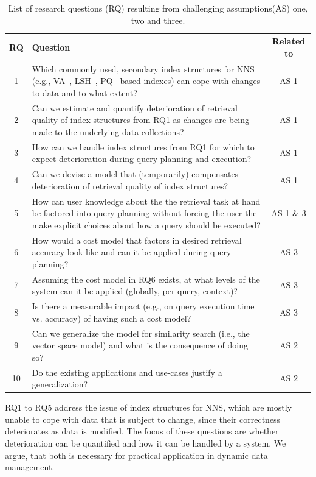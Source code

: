 \begin{table}[h!]
    \centering
    \caption{List of research questions (RQ) resulting from challenging assumptions(AS) one, two and three.}
    \begin{tabular}{|c|p{10cm}|c|} 
     \hline
     \textbf{RQ} & \textbf{Question} & \textbf{Related to} \\ [0.5ex] 
     \hline\hline
     1 & Which commonly used, secondary index structures for NNS (e.g., VA~\cite{Weber:1998va}, LSH~\cite{Indyk:1998lsh}, PQ~\cite{jegou:2011pq} based indexes) can cope with changes to data and to what extent? & AS 1\\ 
     2 & Can we estimate and quantify deterioration of retrieval quality of index structures from RQ1 as changes are being made to the underlying data collections? & AS 1 \\ 
     3 & How can we handle index structures from RQ1 for which to expect deterioration during query planning and execution? & AS 1 \\
     4 & Can we devise a model that (temporarily) compensates deterioration of retrieval quality of index structures? & AS 1 \\
     5 & How can user knowledge about the the retrieval task at hand be factored into query planning without forcing the user the make explicit choices about how a query should be executed? & AS 1 \& 3 \\
     6 & How would a cost model that factors in desired retrieval accuracy look like and can it be applied during query planning? & AS 3\\ 
     7 & Assuming the cost model in RQ6 exists, at what levels of the system can it be applied (globally, per query, context)? & AS 3\\ 
     8 & Is there a measurable impact (e.g., on query execution time vs. accuracy) of having such a cost model? & AS 3 \\ 
     9 & Can we generalize the model for similarity search (i.e., the vector space model) and what is the consequence of doing so? & AS 2 \\ 
     10 & Do the existing applications and use-cases justify a generalization? & AS 2 \\ 
     \hline
    \end{tabular}
    \label{table:research_questions}
\end{table}

RQ1 to RQ5 address the issue of index structures for NNS, which are mostly unable to cope with data that is subject to change, since their correctness deteriorates as data is modified. The focus of these questions are whether deterioration can be quantified and how it can be handled by a system. We argue, that both is necessary for practical application in dynamic data management.

